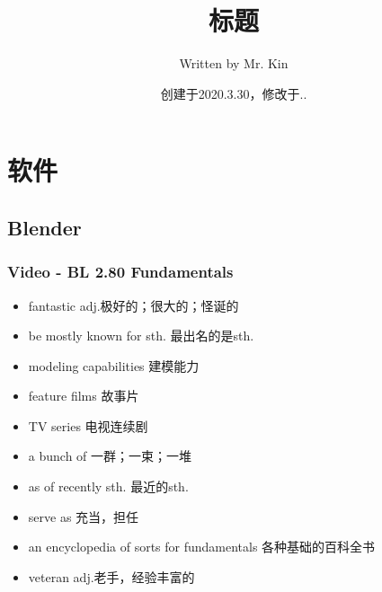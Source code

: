 \documentclass[11pt,a4paper,UTF8,titlepage]{ctexrep} %
\title{\hypertarget{title}{\textbf{标题}}}
\author{Written by Mr. Kin}
\date{创建于2020.3.30，修改于\number\year.\number\month.\number\day}
\makeatletter
\renewcommand{\tableofcontents}%
  {\chapter{\contentsname}%
  \@mkboth{\MakeUppercase\contentsname}{\MakeUppercase\contentsname}%
  \@makeschapterhead{\sourcecodename}%
  \@starttoc{toc}%
}
\makeatother
\begin{document}
    \maketitle %
    {\centering \tableofcontents} %
    \clearpage %
    \fi

    \chapter{软件}
    \section{Blender}
    \subsection{Video - BL 2.80 Fundamentals}
    \begin{multicols}{2}
        \begin{itemize}
            \item fantastic adj.极好的；很大的；怪诞的
            \item be mostly known for sth. 最出名的是sth.
            \item modeling capabilities 建模能力
            \item feature films 故事片
            \item TV series 电视连续剧
            \item a bunch of 一群；一束；一堆
            \item as of recently sth. 最近的sth.
            \item serve as 充当，担任
            \item an encyclopedia of sorts for fundamentals 各种基础的百科全书
            \item veteran adj.老手，经验丰富的
        \end{itemize}
    \end{multicols}


    \ifx\collections\undefined
    \printbibliography %
    \clearpage %
    \printindex %
\end{document}
